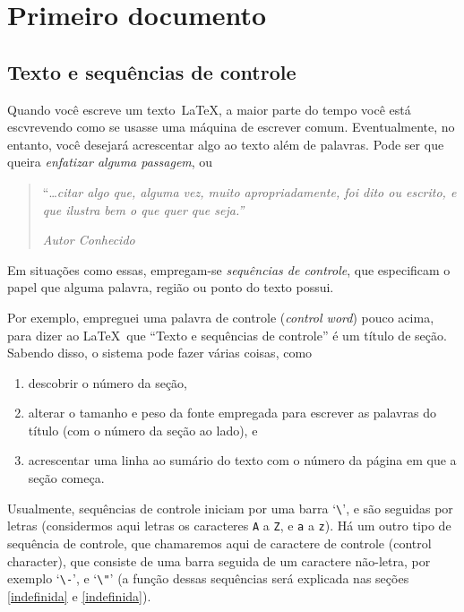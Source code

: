 \section{Primeiro documento}


\subsection{Texto e sequências de controle}

Quando você escreve um texto~\LaTeX, a maior parte do tempo você está
escvrevendo como se usasse uma máquina de escrever
comum. Eventualmente, no entanto, você desejará acrescentar algo ao
texto além de palavras. Pode ser que queira \emph{enfatizar alguma
  passagem}, ou

\begin{quote}
  ``\ldots \textsl{citar algo que, alguma vez, muito apropriadamente, foi
    dito ou escrito, e que ilustra bem o que quer que seja.''}

  \hfill\textsl{Autor Conhecido}
\end{quote}

Em situações como essas, empregam-se \emph{sequências de controle},
que especificam o papel que alguma palavra, região ou ponto do texto
possui.

Por exemplo, empreguei uma palavra de controle (\emph{control word})
pouco acima, para dizer ao \LaTeX\ que ``Texto e sequências de
controle'' é um título de seção. Sabendo disso,  o sistema pode fazer
várias coisas, como
\begin{enumerate}
\item descobrir o número da seção,
\item alterar o tamanho e peso da fonte empregada para escrever as
  palavras do título (com o número da seção ao lado), e
\item acrescentar uma linha ao sumário do texto com o número da página
  em que a seção começa.
\end{enumerate}

Usualmente, sequências de controle iniciam por uma barra `\verb|\|',
e são seguidas por letras (considermos aqui letras os
caracteres {\tt A} a {\tt Z}, e {\tt a} a {\tt z}). Há um outro tipo
de sequência de controle, que chamaremos aqui de caractere de controle
(control character), que consiste de uma barra seguida de um caractere
não-letra, por exemplo `\verb|\-|', e `\verb|\"|' (a função dessas
sequências será explicada nas seções \ref{indefinida} e
\ref{indefinida}).

